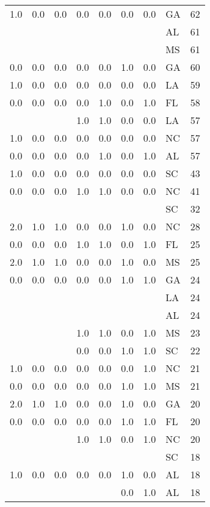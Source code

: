\begin{tabular}{llllllllr}
1.0 & 0.0 & 0.0 & 0.0 & 0.0 & 0.0 & 0.0 & GA &    62 \\
    &     &     &     &     &     &     & AL &    61 \\
    &     &     &     &     &     &     & MS &    61 \\
0.0 & 0.0 & 0.0 & 0.0 & 0.0 & 1.0 & 0.0 & GA &    60 \\
1.0 & 0.0 & 0.0 & 0.0 & 0.0 & 0.0 & 0.0 & LA &    59 \\
0.0 & 0.0 & 0.0 & 0.0 & 1.0 & 0.0 & 1.0 & FL &    58 \\
    &     &     & 1.0 & 1.0 & 0.0 & 0.0 & LA &    57 \\
1.0 & 0.0 & 0.0 & 0.0 & 0.0 & 0.0 & 0.0 & NC &    57 \\
0.0 & 0.0 & 0.0 & 0.0 & 1.0 & 0.0 & 1.0 & AL &    57 \\
1.0 & 0.0 & 0.0 & 0.0 & 0.0 & 0.0 & 0.0 & SC &    43 \\
0.0 & 0.0 & 0.0 & 1.0 & 1.0 & 0.0 & 0.0 & NC &    41 \\
    &     &     &     &     &     &     & SC &    32 \\
2.0 & 1.0 & 1.0 & 0.0 & 0.0 & 1.0 & 0.0 & NC &    28 \\
0.0 & 0.0 & 0.0 & 1.0 & 1.0 & 0.0 & 1.0 & FL &    25 \\
2.0 & 1.0 & 1.0 & 0.0 & 0.0 & 1.0 & 0.0 & MS &    25 \\
0.0 & 0.0 & 0.0 & 0.0 & 0.0 & 1.0 & 1.0 & GA &    24 \\
    &     &     &     &     &     &     & LA &    24 \\
    &     &     &     &     &     &     & AL &    24 \\
    &     &     & 1.0 & 1.0 & 0.0 & 1.0 & MS &    23 \\
    &     &     & 0.0 & 0.0 & 1.0 & 1.0 & SC &    22 \\
1.0 & 0.0 & 0.0 & 0.0 & 0.0 & 0.0 & 1.0 & NC &    21 \\
0.0 & 0.0 & 0.0 & 0.0 & 0.0 & 1.0 & 1.0 & MS &    21 \\
2.0 & 1.0 & 1.0 & 0.0 & 0.0 & 1.0 & 0.0 & GA &    20 \\
0.0 & 0.0 & 0.0 & 0.0 & 0.0 & 1.0 & 1.0 & FL &    20 \\
    &     &     & 1.0 & 1.0 & 0.0 & 1.0 & NC &    20 \\
    &     &     &     &     &     &     & SC &    18 \\
1.0 & 0.0 & 0.0 & 0.0 & 0.0 & 1.0 & 0.0 & AL &    18 \\
    &     &     &     &     & 0.0 & 1.0 & AL &    18 \\

\end{tabular}

